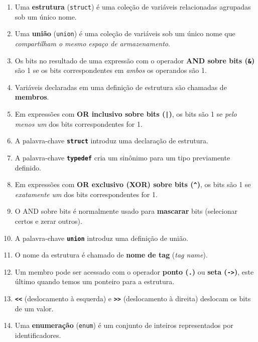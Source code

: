 \documentclass[12pt,a4paper]{article}
\begin{document}
\begin{respostabox}
\begin{enumerate}[label=\textbf{\alph*)}]

\item Uma \textbf{estrutura} (\texttt{struct}) é uma coleção de variáveis relacionadas
agrupadas sob um único nome.

\item Uma \textbf{união} (\texttt{union}) é uma coleção de variáveis sob um único nome
que \textit{compartilham o mesmo espaço de armazenamento}.

\item Os bits no resultado de uma expressão com o operador \textbf{AND sobre bits
(\texttt{\&})} são 1 se os bits correspondentes em \textit{ambos} os operandos são 1.

\item Variáveis declaradas em uma definição de estrutura são chamadas de \textbf{membros}.

\item Em expressões com \textbf{OR inclusivo sobre bits (\texttt{|})}, os bits são 1
se \textit{pelo menos um} dos bits correspondentes for 1.

\item A palavra-chave \textbf{\texttt{struct}} introduz uma declaração de estrutura.

\item A palavra-chave \textbf{\texttt{typedef}} cria um sinônimo para um tipo previamente
definido.

\item Em expressões com \textbf{OR exclusivo (XOR) sobre bits (\texttt{\^{}})}, os bits são
1 se \textit{exatamente um} dos bits correspondentes for 1.

\item O AND sobre bits é normalmente usado para \textbf{mascarar} bits (selecionar
certos e zerar outros).

\item A palavra-chave \textbf{\texttt{union}} introduz uma definição de união.

\item O nome da estrutura é chamado de \textbf{nome de tag} (\textit{tag name}).

\item Um membro pode ser acessado com o operador \textbf{ponto (\texttt{.})} ou
\textbf{seta (\texttt{->})}, este último quando temos um ponteiro para a estrutura.

\item \textbf{\texttt{<<}} (deslocamento à esquerda) e \textbf{\texttt{>>}} (deslocamento
à direita) deslocam os bits de um valor.

\item Uma \textbf{enumeração} (\texttt{enum}) é um conjunto de inteiros representados
por identificadores.

\end{enumerate}
\end{respostabox}
\end{document}
